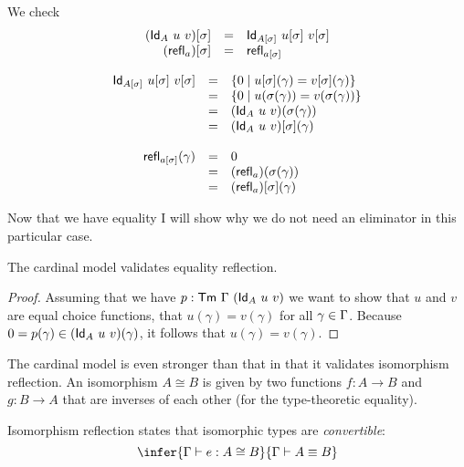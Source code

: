 We check
\[
  \begin{array}{rcl}
    (\mathsf{Id}_A\ u\ v)[\sigma] &=& \mathsf{Id}_{A[\sigma]}\ u[\sigma]\ v[\sigma] \\
    (\mathsf{refl}_a)[\sigma] &=& \mathsf{refl}_{a[\sigma]}
  \end{array}
\]

\[
  \begin{array}{rcl}
    \mathsf{Id}_{A[\sigma]}\ u[\sigma]\ v[\sigma]
    &=& \{ 0 \mid u[\sigma](\gamma) = v[\sigma](\gamma) \} \\
    &=& \{ 0 \mid u(\sigma(\gamma)) = v(\sigma(\gamma)) \} \\
    &=& (\mathsf{Id}_A\ u\ v)(\sigma(\gamma)) \\
    &=& (\mathsf{Id}_A\ u\ v)[\sigma](\gamma) \\
    \\
    \mathsf{refl}_{a[\sigma]}(\gamma)
    &=& 0 \\
    &=& (\mathsf{refl}_a)(\sigma(\gamma)) \\
    &=& (\mathsf{refl}_a)[\sigma](\gamma)
  \end{array}
\]

Now that we have equality I will show why we do not need an eliminator in this
particular case.

\begin{theorem}
  The cardinal model validates equality reflection.
\end{theorem}
%
%
\begin{proof}
  Assuming that we have \(p : \mathsf{Tm}\ \Gamma\ (\mathsf{Id}_A\ u\ v)\) we want to show that
  \(u\) and \(v\) are equal choice functions, \ie that \(u(\gamma) = v(\gamma)\)
  for all \(\gamma \in \Gamma\).
  Because \(0 = p(\gamma) \in (\mathsf{Id}_A\ u\ v)(\gamma)\), it follows that
  \(u(\gamma) = v(\gamma)\).
\end{proof}

The cardinal model is even stronger than that in that it validates isomorphism
reflection.
An isomorphism \(A \cong B\) is given by two functions \(f : A \to B\)
and \(g : B \to A\) that are inverses of each other (for the type-theoretic
equality).

\begin{definition}
  Isomorphism reflection states that isomorphic types are \emph{convertible}:
  \[
    \infer
      {\Ga \vdash e : A \cong B}
      {\Ga \vdash A \equiv B}
  \]
\end{definition}


